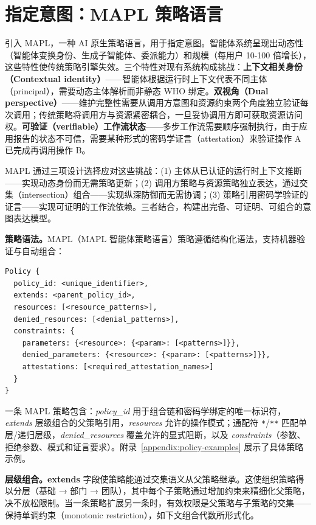 \section{指定意图：MAPL 策略语言}
\label{sec:policy}

引入 MAPL，一种 AI 原生策略语言，用于指定意图。智能体系统呈现出动态性（智能体变换身份、生成子智能体、委派能力）和规模（每用户 10-100 倍增长），这些特性使传统策略引擎失效。三个特性对现有系统构成挑战：\textbf{上下文相关身份（Contextual identity）}——智能体根据运行时上下文代表不同主体（principal），需要动态主体解析而非静态 WHO 绑定。\textbf{双视角（Dual perspective）}——维护完整性需要从调用方意图和资源约束两个角度独立验证每次调用；传统策略将调用方与资源紧密耦合，一旦妥协调用方即可获取资源访问权。\textbf{可验证（verifiable）工作流状态}——多步工作流需要顺序强制执行，由于应用报告的状态不可信，需要某种形式的密码学证言（attestation）来验证操作 A 已完成再调用操作 B。

MAPL 通过三项设计选择应对这些挑战：(1) 主体从已认证的运行时上下文推断——实现动态身份而无需策略更新；(2) 调用方策略与资源策略独立表达，通过交集（intersection）组合——实现纵深防御而无需协调；(3) 策略引用密码学验证的证言——实现可证明的工作流依赖。三者结合，构建出完备、可证明、可组合的意图表达模型。


\noindent\textbf{策略语法。}MAPL（MAPL 智能体策略语言）策略遵循结构化语法，支持机器验证与自动组合：

\begin{lstlisting}[basicstyle=\ttfamily\footnotesize]
Policy {
  policy_id: <unique_identifier>,
  extends: <parent_policy_id>,
  resources: [<resource_patterns>],
  denied_resources: [<denial_patterns>],
  constraints: {
    parameters: {<resource>: {<param>: [<patterns>]}},
    denied_parameters: {<resource>: {<param>: [<patterns>]}},
    attestations: [<required_attestation_names>]
  }
}
\end{lstlisting}

一条 MAPL 策略包含：\textit{policy\_id} 用于组合链和密码学绑定的唯一标识符，\textit{extends} 层级组合的父策略引用，\textit{resources} 允许的操作模式；通配符 \texttt{*}/\texttt{**} 匹配单层/递归层级，\textit{denied\_resources} 覆盖允许的显式阻断，以及 \textit{constraints}（参数、拒绝参数、模式和证言要求）。附录~\ref{appendix:policy-examples} 展示了具体策略示例。

\noindent\textbf{层级组合。}\textbf{extends} 字段使策略能通过交集语义从父策略继承。这使组织策略得以分层（基础 → 部门 → 团队），其中每个子策略通过增加约束来精细化父策略，决不放松限制。当一条策略扩展另一条时，有效权限是父策略与子策略的交集——保持单调约束（monotonic restriction），如下文组合代数所形式化。

